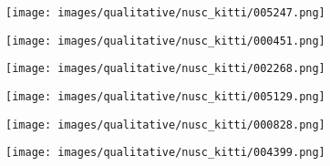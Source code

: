 \documentclass[runningheads]{llncs}
\newcommand{\figureScaleFraction}{1.0}
\newcommand{\nuscenes}{nuScenes}
\newcommand{\gupNet}{GUP Net}
\newcommand{\methodName}{DEVIANT}
\begin{document}
        \begin{figure*}[!tb]
            \centering
\begin{subfigure}{\figureScaleFraction\linewidth}
                \texttt{[image: images/qualitative/nusc\_kitti/005247.png]}
            \end{subfigure}
            \begin{subfigure}{\figureScaleFraction\linewidth}
                \texttt{[image: images/qualitative/nusc\_kitti/000451.png]}
            \end{subfigure}
            \begin{subfigure}{\figureScaleFraction\linewidth}
                \texttt{[image: images/qualitative/nusc\_kitti/002268.png]}
            \end{subfigure}
            \begin{subfigure}{\figureScaleFraction\linewidth}
                \texttt{[image: images/qualitative/nusc\_kitti/005129.png]}
            \end{subfigure}
            \begin{subfigure}{\figureScaleFraction\linewidth}
                \texttt{[image: images/qualitative/nusc\_kitti/000828.png]}
            \end{subfigure}
            \begin{subfigure}{\figureScaleFraction\linewidth}
                \texttt{[image: images/qualitative/nusc\_kitti/004399.png]}
            \end{subfigure}
            \caption{\textbf{\nuscenes{} Cross-Dataset Qualitative Results.}
            \methodName{} predictions in general are more accurate than \textcolor{set1_cyan}{\gupNet} \cite{lu2021geometry}.
            [Key: \textcolor{my_magenta}{Cars} of \methodName; \textcolor{set1_cyan}{Cars} of \gupNet, and \textcolor{my_green}{Ground Truth} in BEV]. }
            \label{fig:qualitative_nusc_kitti}
        \end{figure*}
\end{document}
